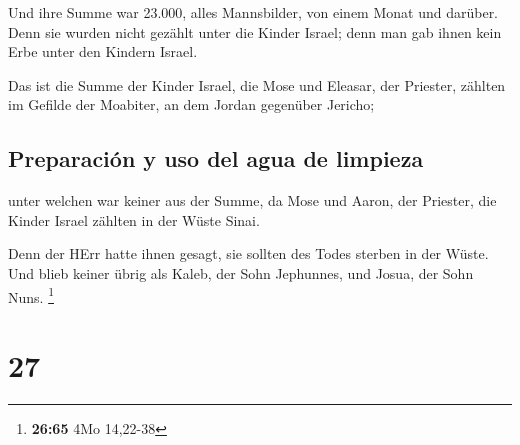  Und ihre Summe war 23.000, alles Mannsbilder, von einem
Monat und darüber. Denn sie wurden nicht gezählt unter die Kinder
Israel; denn man gab ihnen kein Erbe unter den Kindern Israel.

 Das ist die Summe der Kinder Israel, die Mose und
Eleasar, der Priester, zählten im Gefilde der Moabiter, an dem Jordan
gegenüber Jericho;

\hypertarget{preparaciuxf3n-y-uso-del-agua-de-limpieza}{%
\subsection{Preparación y uso del agua de
limpieza}\label{preparaciuxf3n-y-uso-del-agua-de-limpieza}}

 unter welchen war keiner aus der Summe, da Mose und
Aaron, der Priester, die Kinder Israel zählten in der Wüste Sinai.

 Denn der HErr hatte ihnen gesagt, sie sollten des Todes
sterben in der Wüste. Und blieb keiner übrig als Kaleb, der Sohn
Jephunnes, und Josua, der Sohn Nuns. \footnote{\textbf{26:65} 4Mo
  14,22-38}

\hypertarget{section-26}{%
\section{27}\label{section-26}}

